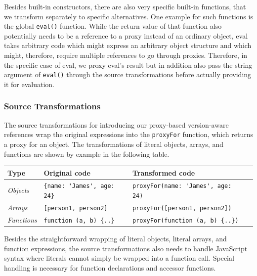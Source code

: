 Besides built-in constructors, there are also very specific built-in functions, that we transform separately to specific alternatives.
One example for such functions is the global \lstinline{eval()} function.
While the return value of that function also potentially needs to be a reference to a proxy instead of an ordinary object, eval takes arbitrary code which might express an arbitrary object structure and which might, therefore, require multiple references to go through proxies.
Therefore, in the specific case of eval, we proxy eval's result but in addition also pass the string argument of \lstinline{eval()} through the source transformations before actually providing it for evaluation.


\subsubsection{Source Transformations}

The source transformations for introducing our proxy-based version-aware references wrap the original expressions into the \lstinline{proxyFor} function, which returns a proxy for an object.
The transformations of literal objects, arrays, and functions are shown by example in the following table.

\begin{center}
    \begin{tabular}{| l | l | l | l |}
    \hline
    Type & Original code & Transformed code \\ \hline
    \emph{Objects} & \lstinline|{name: 'James', age: 24}| & \lstinline|proxyFor(name: 'James', age: 24)| \\ \hline
    \emph{Arrays} & \lstinline|[person1, person2]| & \lstinline|proxyFor([person1, person2])| \\ \hline
    \emph{Functions} & \lstinline|function (a, b) {..}| & \lstinline|proxyFor(function (a, b) {..})| \\ \hline
    \end{tabular}
\end{center}

Besides the straightforward wrapping of literal objects, literal arrays, and function expressions, the source transformations also needs to handle JavaScript syntax where literals cannot simply be wrapped into a function call.
Special handling is necessary for function declarations and accessor functions.

